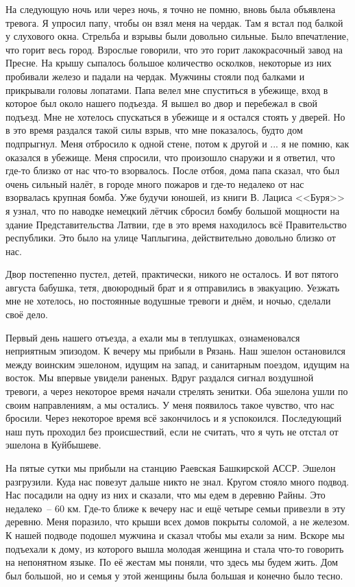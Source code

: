 На следующую ночь или через ночь, я точно не помню, вновь была объявлена тревога. Я упросил папу, чтобы он взял меня на чердак. Там я встал под балкой у слухового окна. Стрельба и взрывы были довольно сильные. Было впечатление, что горит весь город. Взрослые говорили, что это горит лакокрасочный завод на Пресне. На крышу сыпалось большое количество осколков, некоторые из них пробивали железо и падали на чердак. Мужчины стояли под балками и прикрывали головы лопатами. Папа велел мне спуститься в убежище, вход в которое был около нашего подъезда. Я вышел во двор и перебежал в свой подъезд. Мне не хотелось спускаться в убежище и я остался стоять у дверей. Но в это время раздался такой силы взрыв, что мне показалось, будто дом подпрыгнул. Меня отбросило к одной стене, потом к другой и ... я не помню, как оказался в убежище. Меня спросили, что произошло снаружи и я ответил, что где-то близко от нас что-то взорвалось. После отбоя, дома папа сказал, что был очень сильный налёт, в городе много пожаров и где-то недалеко от нас взорвалась крупная бомба. Уже будучи юношей, из книги В. Лациса <<Буря>> я узнал, что по наводке немецкий лётчик сбросил бомбу большой мощности на здание Представительства Латвии, где в это время находилось всё Правительство республики. Это было на улице Чаплыгина, действительно довольно близко от нас.

Двор постепенно пустел, детей, практически, никого не осталось. И вот пятого августа бабушка, тетя, двоюродный брат и я отправились в эвакуацию. Уезжать мне не хотелось, но постоянные водушные тревоги и днём, и ночью, сделали своё дело.

Первый день нашего отъезда, а ехали мы в теплушках, ознаменовался неприятным эпизодом. К вечеру мы прибыли в Рязань. Наш эшелон остановился между воинским эшелоном, идущим на запад, и санитарным поездом, идущим на восток. Мы впервые увидели раненых. Вдруг раздался сигнал воздушной тревоги, а через некоторое время начали стрелять зенитки. Оба эшелона ушли по своим направлениям, а мы остались. У меня появилось такое чувство, что нас бросили. Через некоторое время всё закончилось и я успокоился. Последующий наш путь проходил без происшествий, если не считать, что я чуть не отстал от эшелона в Куйбышеве.

На пятые сутки мы прибыли на станцию Раевская Башкирской АССР. Эшелон разгрузили. Куда нас повезут дальше никто не знал. Кругом стояло много подвод. Нас посадили на одну из них и сказали, что мы едем в деревню Райны. Это недалеко~-- 60 км. Где-то ближе к вечеру нас и ещё четыре семьи привезли в эту деревню. Меня поразило, что крыши всех домов покрыты соломой, а не железом. К нашей подводе подошел мужчина и сказал чтобы мы ехали за ним. Вскоре мы подъехали к дому, из которого вышла молодая женщина и стала что-то говорить на непонятном языке. По её жестам мы поняли, что здесь мы будем жить. Дом был большой, но и семья у этой женщины была большая и конечно было тесно.

